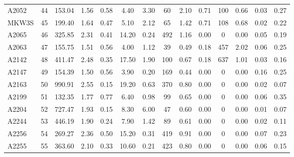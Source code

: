 \documentclass[10pt,aps,pra,reprint,amsmath,amsfonts,amssymb,showpacs,nofootinbib,floatfix]{revtex4-1}
\newcommand{\vst}{\vspace{-0.14mm}}
\begin{document}
\begin{table}
\begin{minipage}{2.0\columnwidth}
\begin{tabular}{l  c c c c c c c c c c c c c}
A2052    &  44 & 153.04 &   1.56 &   0.58 &   4.40 &   3.30 &  60 &   2.10 &   0.71 &  100 &   0.66 &   0.03 &   0.27 \vst \\
MKW3S    &  45 & 199.40 &   1.64 &   0.47 &   5.10 &   2.12 &  65 &   1.42 &   0.71 &  108 &   0.68 &   0.02 &   0.22 \vst \\
A2065    &  46 & 325.85 &   2.31 &   0.41 &  14.20 &   0.24 & 492 &   1.16 &   0.00 &    0 &   0.00 &   0.05 &   0.19 \vst \\
A2063    &  47 & 155.75 &   1.51 &   0.56 &   4.00 &   1.12 &  39 &   0.49 &   0.18 &  457 &   2.02 &   0.06 &   0.25 \vst \\
A2142    &  48 & 411.47 &   2.48 &   0.35 &  17.50 &   1.90 & 100 &   0.67 &   0.18 &  637 &   1.01 &   0.03 &   0.16 \vst \\
A2147    &  49 & 154.39 &   1.50 &   0.56 &   3.90 &   0.20 & 169 &   0.44 &   0.00 &    0 &   0.00 &   0.16 &   0.25 \vst \\
A2163    &  50 & 990.91 &   2.55 &   0.15 &  19.20 &   0.63 & 370 &   0.80 &   0.00 &    0 &   0.00 &   0.02 &   0.07 \vst \\
A2199    &  51 & 132.35 &   1.77 &   0.77 &   6.40 &   0.98 &  99 &   0.65 &   0.00 &    0 &   0.00 &   0.06 &   0.35 \vst \\
A2204    &  52 & 727.47 &   1.93 &   0.15 &   8.30 &   6.00 &  47 &   0.60 &   0.00 &    0 &   0.00 &   0.01 &   0.07 \vst \\
A2244    &  53 & 446.19 &   1.90 &   0.24 &   7.90 &   1.42 &  89 &   0.61 &   0.00 &    0 &   0.00 &   0.02 &   0.11 \vst \\
A2256    &  54 & 269.27 &   2.36 &   0.50 &  15.20 &   0.31 & 419 &   0.91 &   0.00 &    0 &   0.00 &   0.07 &   0.23 \vst \\
A2255    &  55 & 363.60 &   2.10 &   0.33 &  10.60 &   0.21 & 423 &   0.80 &   0.00 &    0 &   0.00 &   0.06 &   0.15 \vst \\
\end{tabular}
 \label{tab:flux_tab_CLp}
\end{minipage}
\end{table} 
\newpage
\end{document}
